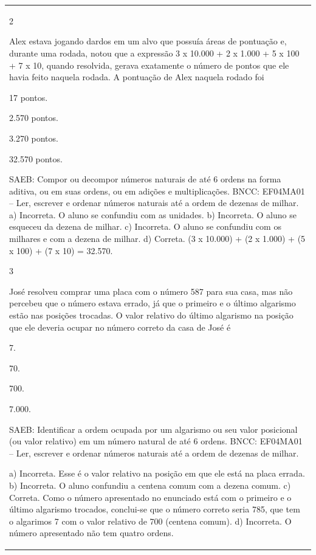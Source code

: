 \begin{mdframed}[linewidth=2pt,linecolor=salmao,roundcorner=2pt]
\begin{escolha}
{{{\begin{longtable}[]{@{}l@{}}
\begin{itemize}
{\num{2}

Alex estava jogando dardos em um alvo que possuía áreas de pontuação e,
durante uma rodada, notou que a expressão 3 x 10.000 + 2 x 1.000 + 5 x
100 + 7 x 10, quando resolvida, gerava exatamente o número de pontos que
ele havia feito naquela rodada. A pontuação de Alex naquela rodado foi

\begin{escolha}
\item
  17 pontos.
\item
  2.570 pontos.
\item
  3.270 pontos.
\item
  32.570 pontos.
\end{escolha}

SAEB: Compor ou decompor números naturais de até 6 ordens na forma aditiva, ou
em suas ordens, ou em adições e multiplicações.
BNCC: EF04MA01 -- Ler, escrever e ordenar números naturais até a ordem de dezenas de milhar.
a) Incorreta. O aluno se confundiu com as unidades.
b) Incorreta. O aluno se esqueceu da dezena de milhar.
c) Incorreta. O aluno se confundiu com os milhares e com a dezena de milhar.
d) Correta. (3 x 10.000) + (2 x 1.000) + (5 x 100) + (7 x 10) = 32.570.

\num{3}

José resolveu comprar uma placa com o número 587 para sua casa, mas
não percebeu que o número estava
errado, já que o primeiro e o último algarismo estão nas posições
trocadas. O valor relativo do último algarismo na posição que ele deveria ocupar no número correto da casa de José é

\begin{escolha}
\item
  7.
\item
  70.
\item
  700.
\item
  7.000.
\end{escolha}

SAEB: Identificar a ordem ocupada por um algarismo ou seu valor posicional (ou
valor relativo) em um número natural de até 6 ordens.
BNCC: EF04MA01 -- Ler, escrever e ordenar números naturais até a ordem de dezenas de milhar.

a) Incorreta. Esse é o valor relativo na posição em que ele está na placa errada.
b) Incorreta. O aluno confundiu a centena comum com a dezena comum.
c) Correta. Como o número apresentado no enunciado está com o primeiro e o último
algarismo trocados, conclui-se que o número correto seria 785, que tem o algarimos 7 com o valor relativo de 700 (centena comum).
d) Incorreta. O número apresentado não tem quatro ordens.

}
\end{itemize}
\end{longtable}}}}
\end{escolha}
\end{mdframed}
